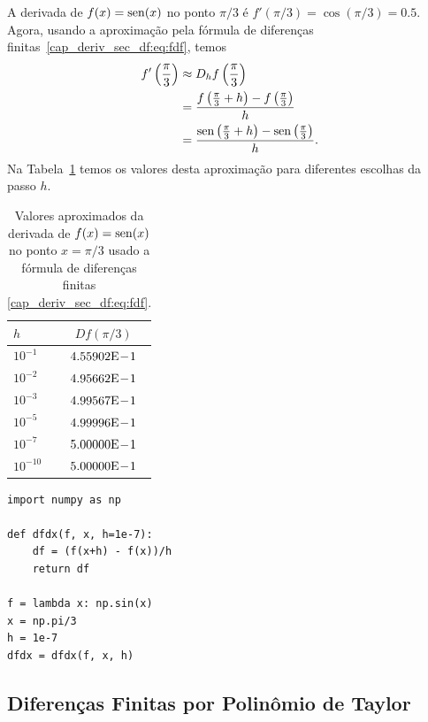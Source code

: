 \begin{ex}\label{cap_deriv_sec_df:ex_intro_deriv}
  A derivada de $f(x) = \operatorname{sen}(x)$ no ponto $\pi/3$ é $f'(\pi/3) = \cos(\pi/3)=0.5$. Agora, usando a aproximação pela fórmula de diferenças finitas~\eqref{cap_deriv_sec_df:eq:fdf}, temos
  \begin{subequations}
    \begin{align}
      f'\left(\frac{\pi}{3}\right) &\approx D_hf\left(\frac{\pi}{3}\right) \\
                                   &= \frac{f\left(\frac{\pi}{3}+h\right)-f\left(\frac{\pi}{3}\right)}{h}\\
                                   &= \frac{\operatorname{sen}\left(\frac{\pi}{3}+h\right)-\operatorname{sen}\left(\frac{\pi}{3}\right)}{h}. 
    \end{align}
\end{subequations}
Na Tabela~\ref{cap_deriv_sec_df:tab:ex_intro_deriv} temos os valores desta aproximação para diferentes escolhas da passo $h$.

\begin{table}[H]
  \centering
  \caption{Valores aproximados da derivada de $f(x)=\operatorname{sen}(x)$ no ponto $x=\pi/3$ usado a fórmula de diferenças finitas \eqref{cap_deriv_sec_df:eq:fdf}.}
  \begin{tabular}{l|c}
    $h$ & $Df(\pi/3)$ \\ \hline
    $10^{-1}$ & $4.55902\mathrm{E}\!-\!1$ \\
    $10^{-2}$ & $4.95662\mathrm{E}\!-\!1$ \\
    $10^{-3}$ & $4.99567\mathrm{E}\!-\!1$ \\
    $10^{-5}$ & $4.99996\mathrm{E}\!-\!1$ \\
    $10^{-7}$ & $5.00000\mathrm{E}\!-\!1$ \\
    $10^{-10}$ & $5.00000\mathrm{E}\!-\!1$ \\\hline
  \end{tabular}
  \label{cap_deriv_sec_df:tab:ex_intro_deriv}
\end{table}

\begin{lstlisting}
import numpy as np

def dfdx(f, x, h=1e-7):
    df = (f(x+h) - f(x))/h
    return df

f = lambda x: np.sin(x)
x = np.pi/3
h = 1e-7
dfdx = dfdx(f, x, h)
\end{lstlisting}
\end{ex}

\subsection{Diferenças Finitas por Polinômio de Taylor}

